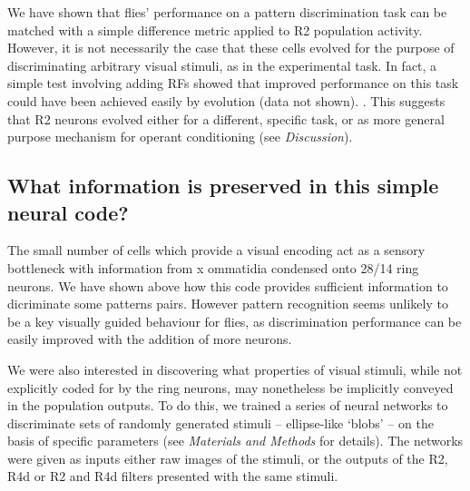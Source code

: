 We have shown that flies' performance on a pattern discrimination task can be matched with a simple difference metric applied to R2 population activity.
However, it is not necessarily the case that these cells evolved for the purpose of discriminating arbitrary visual stimuli, as in the experimental task.
In fact, a simple test involving adding RFs showed that improved performance on this task could have been achieved easily by evolution (data not shown). . This suggests that R2 neurons evolved either for a different, specific task, or as more general purpose mechanism for operant conditioning (see \emph{Discussion}). 


\subsection{What information is preserved in this simple neural code?}

The small number of cells which provide a visual encoding act as a sensory bottleneck with information from x ommatidia condensed onto 28/14 ring neurons. We have shown above how this code provides sufficient information to dicriminate some patterns pairs. However pattern recognition seems unlikely to be a key visually guided behaviour for flies, as discrimination performance can be easily improved with the addition of more neurons.

We were also interested in discovering what properties of visual stimuli, while not explicitly coded for by the ring neurons, may nonetheless be implicitly conveyed in the population outputs.
To do this, we trained a series of neural networks to discriminate sets of randomly generated stimuli -- ellipse-like `blobs' -- on the basis of specific parameters (see \emph{Materials and Methods} for details).
The networks were given as inputs either raw images of the stimuli, or the outputs of the R2, R4d or R2 and R4d filters presented with the same stimuli.

